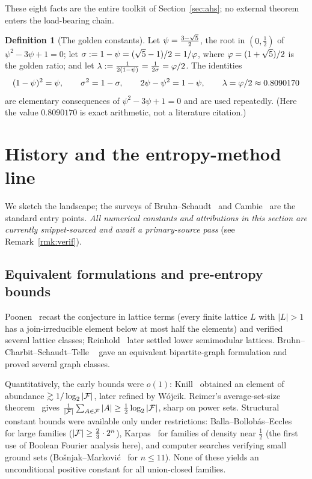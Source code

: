 \documentclass[11pt]{amsart}
\theoremstyle{definition}
\newtheorem{definition}[theorem]{Definition}
\theoremstyle{remark}
\begin{document}
These eight facts are the entire toolkit of Section~\ref{sec:ahs}; no external
theorem enters the load-bearing chain.

\begin{definition}[The golden constants]\label{def:golden}
Let $\psi=\tfrac{3-\sqrt{5}}{2}$, the root in $(0,\tfrac12)$ of $\psi^2-3\psi+1=0$; let
$\sigma:=1-\psi=(\sqrt5-1)/2=1/\varphi$, where $\varphi=(1+\sqrt5)/2$ is the golden
ratio; and let $\lambda:=\tfrac{1}{2(1-\psi)}=\tfrac{1}{2\sigma}=\varphi/2$. The
identities
\begin{equation}\label{eq:psi-id}
   (1-\psi)^2=\psi,\qquad \sigma^2=1-\sigma,\qquad 2\psi-\psi^2=1-\psi,\qquad
   \lambda=\varphi/2\approx 0.8090170
\end{equation}
are elementary consequences of $\psi^2-3\psi+1=0$ and are used repeatedly. (Here
the value $0.8090170$ is exact arithmetic, not a literature citation.)
\end{definition}

\section{History and the entropy-method line}
\label{sec:history}

We sketch the landscape; the surveys of Bruhn--Schaudt~\cite{bruhnschaudt2015survey}
and Cambie~\cite{cambie2023} are the standard entry points. \emph{All numerical constants and attributions in this
section are currently snippet-sourced and await a primary-source pass} (see
Remark~\ref{rmk:verif}).

\subsection{Equivalent formulations and pre-entropy bounds}
Poonen~\cite{poonen1992} recast the conjecture in lattice terms (every finite
lattice $L$ with $|L|>1$ has a join-irreducible element below at most half the
elements) and verified several lattice classes; Reinhold~\cite{reinhold2000}
later settled lower semimodular lattices. Bruhn--Charbit--Schaudt--Telle%
~\cite{bruhn2015} gave an equivalent bipartite-graph formulation and proved
several graph classes.

Quantitatively, the early bounds were $o(1)$: Knill~\cite{knill1994} obtained an
element of abundance $\gtrsim 1/\log_2|\mathcal{F}|$, later refined by W\'ojcik.
Reimer's average-set-size theorem~\cite{reimer2003} gives
$\frac1{|\mathcal{F}|}\sum_{A\in\mathcal{F}}|A|\ge\tfrac12\log_2|\mathcal{F}|$, sharp on power sets.
Structural constant bounds were available only under restrictions:
Balla--Bollob\'as--Eccles~\cite{bbe2013} for large families
($|\mathcal{F}|\ge\tfrac23\cdot2^n$),
Karpas~\cite{karpas2017} for families of density near $\tfrac12$ (the first use
of Boolean Fourier analysis here), and computer searches verifying small ground
sets (Bo\v snjak--Markovi\'c~\cite{bosnjakmarkovic2008} for $n\le 11$). None of
these yields an unconditional positive constant for all union-closed families.
\end{document}
